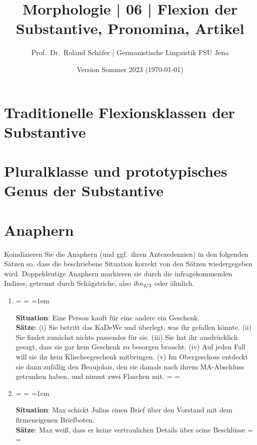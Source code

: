 \documentclass[12pt,a4paper,twoside]{article}
\author{Prof.\ Dr.\ Roland Schäfer | Germanistische Linguistik FSU Jena}
\title{Morphologie | 06 | Flexion der Substantive, Pronomina, Artikel}
\date{Version Sommer 2023 (\today)}
\newcommand{\Sub}[1]{\ensuremath{_{\text{#1}}}}
\newenvironment{spread}
{%
  \newdimen\origiwspc%
  \newdimen\origiwstr%
  \origiwspc=\fontdimen2\font%
  \origiwstr=\fontdimen3\font%
  \fontdimen2\font=1em%
  \doublespacing%
}{%
  \fontdimen2\font=\origiwspc%
  \fontdimen3\font=\origiwstr%
}
\begin{document}
\maketitle

\section{Traditionelle Flexionsklassen der Substantive}


\section{Pluralklasse und prototypisches Genus der Substantive}


\section{Anaphern}

Koindizieren Sie die Anaphern (und ggf.\ ihren Antezedenzien) in den folgenden Sätzen so, dass die beschriebene Situation korrekt von den Sätzen wiedergegeben wird.
Doppeldeutige Anaphern markieren sie durch die infragekommenden Indizes, getrennt durch Schägstriche, also \textit{ihn\Sub{2\slash 3}} oder ähnlich.

\begin{enumerate}
  \item\doublespacing%
    \begin{spread}
      \textbf{Situation}: Eine Person kauft für eine andere ein Geschenk.\\
      \textbf{Sätze}: (i) Sie betritt das KaDeWe und überlegt, was ihr gefallen könnte.
      (ii) Sie findet zunächst nichts passendes für sie.
      (iii) Sie hat ihr ausdrücklich gesagt, dass sie gar kein Geschenk zu besorgen braucht.
      (iv) Auf jeden Fall will sie ihr kein Klischeegeschenk mitbringen.
      (v) Im Obergeschoss entdeckt sie dann zufällig den Beaujolais, den sie damals nach ihrem MA-Abschluss getrunken haben, und nimmt zwei Flaschen mit.\end{spread}
  \item\doublespacing
    \begin{spread}
      \textbf{Situation}: Max schickt Julius einen Brief über den Vorstand mit dem firmeneigenen Briefboten.\\
      \textbf{Sätze}: Max weiß, dass er keine vertraulichen Details über seine Beschlüsse
  \end{spread}
\end{enumerate}
\end{document}
